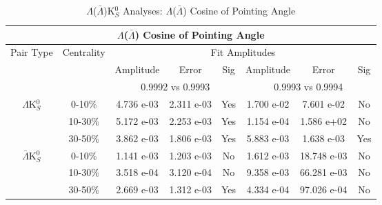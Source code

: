 \documentclass[../AnalysisNoteJBuxton.tex]{subfiles}
\begin{document}
\begin{table}
 \centering
 \begin{tabular}{|c|c|c|c|c||c|c|c|}
  \multicolumn{8}{c}{$\Lambda$($\bar{\Lambda}$) Cosine of Pointing Angle} \\
  \hline
  \multirow{3}{*}{Pair Type} & \multirow{3}{*}{Centrality} & \multicolumn{6}{c|}{Fit Amplitudes} \\
  \cline{3-8}
   & & Amplitude & Error & Sig & Amplitude & Error & Sig \\  
  \cline{3-8}
   & & \multicolumn{3}{c||}{0.9992 vs 0.9993} & \multicolumn{3}{c|}{0.9993 vs 0.9994} \\  
  \hline  
  \multirow{3}{*}{$\Lambda$K$^{0}_{S}$}  
   &  0-10\% & 4.736 e-03 & 2.311 e-03 & Yes & 1.700 e-02 & 7.601 e-02 & No \\
   & 10-30\% & 5.172 e-03 & 2.253 e-03 & Yes & 1.154 e-04 & 1.586 e+02 & No \\
   & 30-50\% & 3.862 e-03 & 1.806 e-03 & Yes & 5.883 e-03 & 1.638 e-03 & Yes \\
  \hline  
  \multirow{3}{*}{$\bar{\Lambda}$K$^{0}_{S}$}  
   &  0-10\% & 1.141 e-03 & 1.203 e-03 & No & 1.612 e-03 & 18.748 e-03 & No \\
   & 10-30\% & 3.518 e-04 & 3.120 e-04 & No & 9.358 e-03 & 66.281 e-03 & No \\
   & 30-50\% & 2.669 e-03 & 1.312 e-03 & Yes & 4.334 e-04 & 97.026 e-04 & No \\
  \hline
 \end{tabular}
 \caption{$\Lambda$($\bar{\Lambda}$)K$^{0}_{S}$ Analyses: $\Lambda$($\bar{\Lambda}$) Cosine of Pointing Angle}
 \label{tab:LamCosPointingAngleLamK0}
\end{table}
\end{document}
